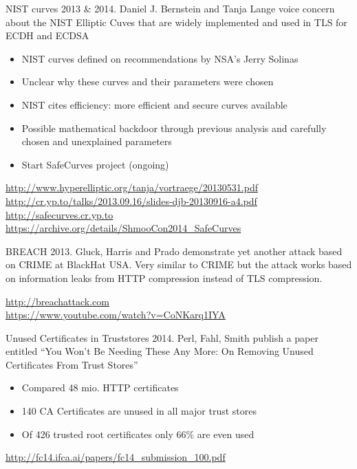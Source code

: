 \begin{frame}{NIST curves}
  2013 \& 2014. Daniel J. Bernstein and Tanja Lange voice concern about the NIST Elliptic Cuves that are widely implemented and used in TLS for ECDH and ECDSA
  \begin{itemize}
    \item NIST curves defined on recommendations by NSA's Jerry Solinas
    \item Unclear why these curves and their parameters were chosen
    \item NIST cites efficiency: more efficient and secure curves available
    \item Possible mathematical backdoor through previous analysis and carefully chosen and unexplained parameters
    \item Start SafeCurves project (ongoing)
  \end{itemize}
  

  \tiny
  \url{http://www.hyperelliptic.org/tanja/vortraege/20130531.pdf}\\
  \url{http://cr.yp.to/talks/2013.09.16/slides-djb-20130916-a4.pdf}\\
  \url{http://safecurves.cr.yp.to}\\
  \url{https://archive.org/details/ShmooCon2014_SafeCurves}
\end{frame}

\begin{frame}{BREACH}
  2013. Gluck, Harris and Prado demonstrate yet another attack based on CRIME at BlackHat USA.
  \newline
  \newline
  Very similar to CRIME but the attack works based on information leaks from HTTP compression instead of TLS compression.
  
  \vspace{80px}

  \tiny
  \url{http://breachattack.com}\\
  \url{https://www.youtube.com/watch?v=CoNKarq1IYA}
\end{frame}

\begin{frame}{Unused Certificates in Truststores}
  2014. Perl, Fahl, Smith publish a paper entitled ``You Won't Be Needing These Any More: On Removing Unused Certificates From Trust Stores''
  \begin{itemize}
    \item Compared 48 mio. HTTP certificates
    \item 140 CA Certificates are unused in all major trust stores
    \item Of 426 trusted root certificates only 66\% are even used
  \end{itemize}

  
  \vspace{70px}

  \tiny
  \url{http://fc14.ifca.ai/papers/fc14_submission_100.pdf}
\end{frame}

